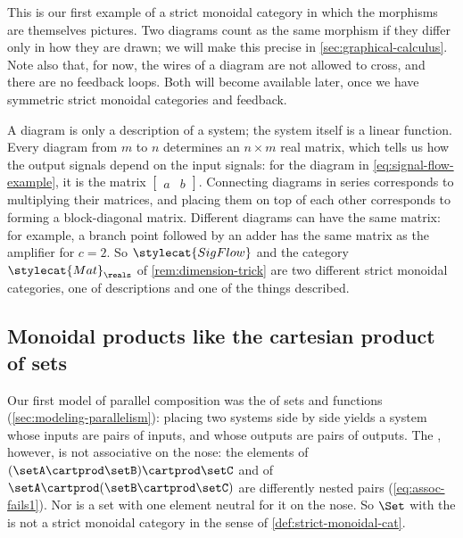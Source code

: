 \begin{example}
    This is our first example of a strict monoidal category in which the morphisms are themselves pictures.
    Two diagrams count as the same morphism if they differ only in how they are drawn; we will make this precise in \cref{sec:graphical-calculus}.
    Note also that, for now, the wires of a diagram are not allowed to cross, and there are no feedback loops.
    Both will become available later, once we have symmetric strict monoidal categories and feedback.

    A diagram is only a description of a system; the system itself is a linear function.
    Every diagram from $m$ to $n$ determines an $n \times m$ real matrix, which tells us how the output signals depend on the input signals: for the diagram in \cref{eq:signal-flow-example}, it is the matrix $\begin{bmatrix} a & b \end{bmatrix}$.
    Connecting diagrams in series corresponds to multiplying their matrices, and placing them on top of each other corresponds to forming a block-diagonal matrix.
    Different diagrams can have the same matrix: for example, a branch point followed by an adder has the same matrix as the amplifier for $c = 2$.
    So $\stylecat{SigFlow}$ and the category $\stylecat{Mat}_\reals$ of \cref{rem:dimension-trick} are two different strict monoidal categories, one of descriptions and one of the things described.
\end{example}

\subsection{Monoidal products like the cartesian product of sets}
\label{sec:strict-monoidal-lists}

Our first model of parallel composition was the  of sets and functions (\cref{sec:modeling-parallelism}): placing two systems side by side yields a system whose inputs are pairs of inputs, and whose outputs are pairs of outputs.
The , however, is not associative on the nose: the elements of $(\setA \cartprod \setB) \cartprod \setC$ and of $\setA \cartprod (\setB \cartprod \setC)$ are differently nested pairs (\cref{eq:assoc-fails1}).
Nor is a set with one element neutral for it on the nose.
So $\Set$ with the  is not a strict monoidal category in the sense of \cref{def:strict-monoidal-cat}.


